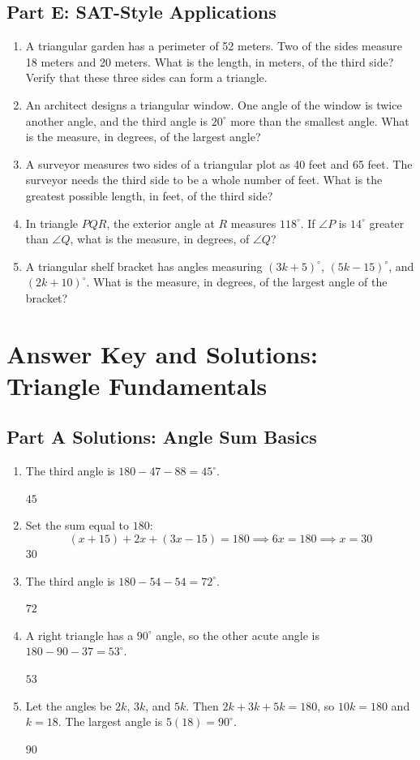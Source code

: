 \documentclass[14pt]{extarticle}
\begin{document}
\subsection*{Part E: SAT-Style Applications}
\begin{enumerate}
  \item A triangular garden has a perimeter of 52 meters. Two of the sides measure 18 meters and 20 meters. What is the length, in meters, of the third side? Verify that these three sides can form a triangle.
  \item An architect designs a triangular window. One angle of the window is twice another angle, and the third angle is \(20^\circ\) more than the smallest angle. What is the measure, in degrees, of the largest angle?
  \item A surveyor measures two sides of a triangular plot as 40 feet and 65 feet. The surveyor needs the third side to be a whole number of feet. What is the greatest possible length, in feet, of the third side?
  \item In triangle \(PQR\), the exterior angle at \(R\) measures \(118^\circ\). If \(\angle P\) is \(14^\circ\) greater than \(\angle Q\), what is the measure, in degrees, of \(\angle Q\)?
  \item A triangular shelf bracket has angles measuring \((3k + 5)^\circ\), \((5k - 15)^\circ\), and \((2k + 10)^\circ\). What is the measure, in degrees, of the largest angle of the bracket?
\end{enumerate}

\newpage

\section*{Answer Key and Solutions: Triangle Fundamentals}

\subsection*{Part A Solutions: Angle Sum Basics}
\begin{enumerate}
  \item The third angle is \(180 - 47 - 88 = 45^\circ\).

  \(\boxed{45}\)

  \item Set the sum equal to \(180\):
  \[
  (x + 15) + 2x + (3x - 15) = 180 \implies 6x = 180 \implies x = 30
  \]
  \(\boxed{30}\)

  \item The third angle is \(180 - 54 - 54 = 72^\circ\).

  \(\boxed{72}\)

  \item A right triangle has a \(90^\circ\) angle, so the other acute angle is \(180 - 90 - 37 = 53^\circ\).

  \(\boxed{53}\)

  \item Let the angles be \(2k\), \(3k\), and \(5k\). Then \(2k + 3k + 5k = 180\), so \(10k = 180\) and \(k = 18\). The largest angle is \(5(18) = 90^\circ\).

  \(\boxed{90}\)
\end{enumerate}
\end{document}
